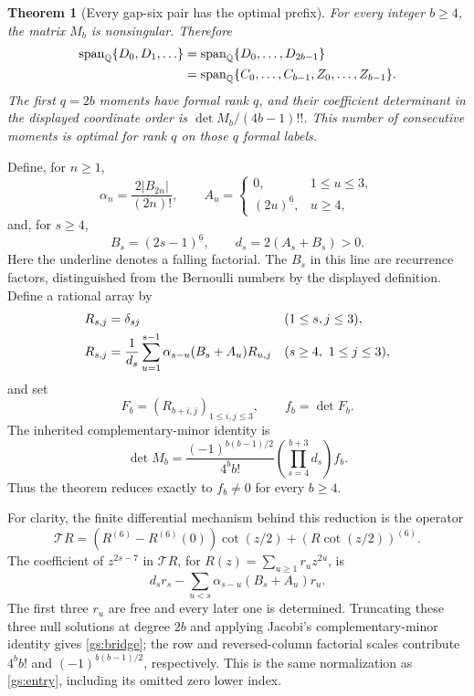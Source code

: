 \documentclass[11pt,a4paper]{article}
\newtheorem{theorem}{Theorem}[section]
\theoremstyle{definition}
\theoremstyle{remark}
\numberwithin{equation}{section}
\begin{document}
\begin{theorem}[Every gap-six pair has the optimal prefix]
\label{gs:main}
For every integer $b\ge4$, the matrix $M_b$ is nonsingular.  Therefore
\begin{align}\label{gs:span}
 \operatorname{span}_{\mathbb Q}\{D_0,D_1,\ldots\}
 &=\operatorname{span}_{\mathbb Q}\{D_0,\ldots,D_{2b-1}\}\\
 &=\operatorname{span}_{\mathbb Q}
 \{C_0,\ldots,C_{b-1},Z_0,\ldots,Z_{b-1}\}.\notag
\end{align}
The first $q=2b$ moments have formal rank $q$, and their coefficient
determinant in the displayed coordinate order is
$\det M_b/(4b-1)!!$.  This number of consecutive moments is optimal
for rank $q$ on those $q$ formal labels.
\end{theorem}

Define, for $n\ge1$,
\[
 \alpha_n=\frac{2|B_{2n}|}{(2n)!},\qquad
 A_u=\begin{cases}0,&1\le u\le3,\\
                   (2u)^{\underline6},&u\ge4,
       \end{cases}
\]
and, for $s\ge4$,
\[
 B_s=(2s-1)^{\underline6},\qquad d_s=2(A_s+B_s)>0.
\]
Here the underline denotes a falling factorial.  The $B_s$ in this
line are recurrence factors, distinguished from the Bernoulli numbers
by the displayed definition.  Define a rational array by
\begin{align}
 R_{s,j}&=\delta_{sj}&&(1\le s,j\le3),\notag\\
 R_{s,j}&=\frac1{d_s}\sum_{u=1}^{s-1}
             \alpha_{s-u}(B_s+A_u)R_{u,j}
           &&(s\ge4,\ 1\le j\le3),\label{gs:recurrence}
\end{align}
and set
\[
 F_b=(R_{b+i,j})_{1\le i,j\le3},\qquad f_b=\det F_b.
\]
The inherited complementary-minor identity
\cite[Section~8, fixed-gap boundary reduction]{OrderedIncoming} is
\begin{equation}\label{gs:bridge}
 \det M_b=\frac{(-1)^{b(b-1)/2}}{4^bb!}
        \left(\prod_{s=4}^{b+3}d_s\right)f_b.
\end{equation}
Thus the theorem reduces exactly to $f_b\ne0$ for every $b\ge4$.

For clarity, the finite differential mechanism behind this reduction
is the operator
\[
 \mathcal T R=(R^{(6)}-R^{(6)}(0))\cot(z/2)
                       +(R\cot(z/2))^{(6)}.
\]
The coefficient of $z^{2s-7}$ in $\mathcal T R$, for
$R(z)=\sum_{u\ge1}r_uz^{2u}$, is
\[
 d_sr_s-\sum_{u<s}\alpha_{s-u}(B_s+A_u)r_u.
\]
The first three $r_u$ are free and every later one is determined.
Truncating these three null solutions at degree $2b$ and applying
Jacobi's complementary-minor identity gives \eqref{gs:bridge}; the
row and reversed-column factorial scales contribute $4^bb!$ and
$(-1)^{b(b-1)/2}$, respectively.  This is the same normalization as
\eqref{gs:entry}, including its omitted zero lower index.
\end{document}
